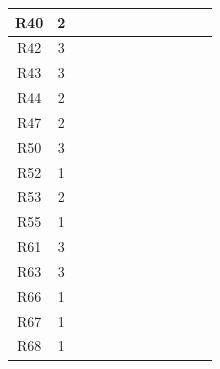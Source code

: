 \documentclass[12pt]{article}
\begin{document}
\begin{longtable}{|c|c|c|c|c|c|c|c|c|c|c|c|}
		\hline
		R40         & 2          &           &           &           &           &           &           &           &           &           &           \\
		\hline
		R42         & 3          &           &           &           &           &           &           &           &           &           &           \\
		\hline
		R43         & 3          &           &           &           &           &           &           &           &           &           &           \\
		\hline
		R44         & 2          &           &           &           &           &           &           &           &           &           &           \\
		\hline
		R47         & 2          &           &           &           &           &           &           &           &           &           & \ding{51} \\
		\hline
		R50         & 3          &           &           &           &           &           &           &           &           &           &           \\
		\hline
		R52         & 1          &           &           &           &           &           &           &           &           &           &           \\
		\hline
		R53         & 2          &           &           &           &           &           &           &           &           &           &           \\
		\hline
		R55         & 1          &           &           &           &           &           &           &           &           &           &           \\
		\hline
		R61         & 3          &           &           &           &           &           &           &           &           &           &           \\
		\hline
		R63         & 3          &           &           &           &           &           &           &           &           &           &           \\
		\hline
		R66         & 1          &           &           &           &           &           &           &           &           &           &           \\
		\hline
		R67         & 1          &           &           &           &           &           &           &           &           &           &           \\
		\hline
		R68         & 1          &           &           &           &           &           &           &           &           &           &           \\

\end{longtable}
\end{document}
